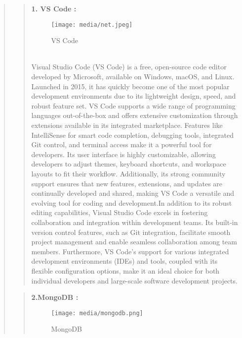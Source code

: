 \documentclass[12pt]{report}
\begin{document}
	\begin{quote}
		
		\begin{quote}
			\textbf{1. VS Code :}
			\begin{figure}[h]
				\centering
				\texttt{[image: media/net.jpeg]}\\
				\caption{VS Code}
				
			\end{figure}
			\\Visual Studio Code (VS Code) is a free, open-source code editor developed by Microsoft, available on Windows, macOS, and Linux. Launched in 2015, it has quickly become one of the most popular development environments due to its lightweight design, speed, and robust feature set. VS Code supports a wide range of programming languages out-of-the-box and offers extensive customization through extensions available in its integrated marketplace. Features like IntelliSense for smart code completion, debugging tools, integrated Git control, and terminal access make it a powerful tool for developers. Its user interface is highly customizable, allowing developers to adjust themes, keyboard shortcuts, and workspace layouts to fit their workflow. Additionally, its strong community support ensures that new features, extensions, and updates are continually developed and shared, making VS Code a versatile and evolving tool for coding and development.In addition to its robust editing capabilities, Visual Studio Code excels in fostering collaboration and integration within development teams. Its built-in version control features, such as Git integration, facilitate smooth project management and enable seamless collaboration among team members. Furthermore, VS Code's support for various integrated development environments (IDEs) and tools, coupled with its flexible configuration options, make it an ideal choice for both individual developers and large-scale software development projects. 
		\end{quote}
		\clearpage
		
		\begin{quote}
			\textbf{2.MongoDB  :}
			\begin{figure}[h]
				\centering
				\texttt{[image: media/mongodb.png]}\\
				\caption{MongoDB}
				

\end{figure}
\end{quote}
\end{quote}
\end{document}
